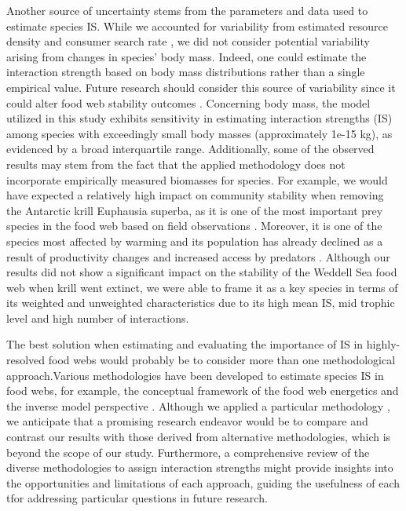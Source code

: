 \documentclass[gc, manuscript]{copernicus}
\begin{document}
Another source of uncertainty stems from the parameters and data used to
estimate species IS. While we accounted for variability from estimated
resource density and consumer search rate \citep{Pawar2012}, we did not
consider potential variability arising from changes in species' body
mass. Indeed, one could estimate the interaction strength based on body
mass distributions rather than a single empirical value. Future research
should consider this source of variability since it could alter food web
stability outcomes
\citep{Brose2006a, Allesina2015, Gross2009, Landi2018}. Concerning body
mass, the model utilized in this study exhibits sensitivity in
estimating interaction strengths (IS) among species with exceedingly
small body masses (approximately 1e-15 kg), as evidenced by a broad
interquartile range. Additionally, some of the observed results may stem
from the fact that the applied methodology does not incorporate
empirically measured biomasses for species. For example, we would have
expected a relatively high impact on community stability when removing
the Antarctic krill Euphausia superba, as it is one of the most
important prey species in the food web based on field observations
\citep{Atkinson2019}. Moreover, it is one of the species most affected
by warming and its population has already declined as a result of
productivity changes and increased access by predators
\citep{Atkinson2004, Kawaguchi2009}. Although our results did not show a
significant impact on the stability of the Weddell Sea food web when
krill went extinct, we were able to frame it as a key species in terms
of its weighted and unweighted characteristics due to its high mean IS,
mid trophic level and high number of interactions.

The best solution when estimating and evaluating the importance of IS in
highly-resolved food webs would probably be to consider more than one
methodological approach.Various methodologies have been developed to
estimate species IS in food webs, for example, the conceptual framework
of the food web energetics \citep{Gauzens2019} and the inverse model
perspective \citep{Gellner2023}. Although we applied a particular
methodology \citep{Pawar2012}, we anticipate that a promising research
endeavor would be to compare and contrast our results with those derived
from alternative methodologies, which is beyond the scope of our study.
Furthermore, a comprehensive review of the diverse methodologies to
assign interaction strengths might provide insights into the
opportunities and limitations of each approach, guiding the usefulness
of each tfor addressing particular questions in future research.
\end{document}
